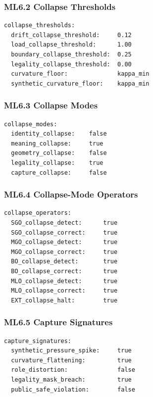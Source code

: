 \subsubsection*{ML6.2 Collapse Thresholds}

\begin{verbatim}
collapse_thresholds:
  drift_collapse_threshold:     0.12
  load_collapse_threshold:      1.00
  boundary_collapse_threshold:  0.25
  legality_collapse_threshold:  0.00
  curvature_floor:              kappa_min
  synthetic_curvature_floor:    kappa_min
\end{verbatim}
\subsubsection*{ML6.3 Collapse Modes}

\begin{verbatim}
collapse_modes:
  identity_collapse:    false
  meaning_collapse:     true
  geometry_collapse:    false
  legality_collapse:    true
  capture_collapse:     false
\end{verbatim}

\subsubsection*{ML6.4 Collapse-Mode Operators}

\begin{verbatim}
collapse_operators:
  SGO_collapse_detect:      true
  SGO_collapse_correct:     true
  MGO_collapse_detect:      true
  MGO_collapse_correct:     true
  BO_collapse_detect:       true
  BO_collapse_correct:      true
  MLO_collapse_detect:      true
  MLO_collapse_correct:     true
  EXT_collapse_halt:        true
\end{verbatim}

\subsubsection*{ML6.5 Capture Signatures}

\begin{verbatim}
capture_signatures:
  synthetic_pressure_spike:     true
  curvature_flattening:         true
  role_distortion:              false
  legality_mask_breach:         true
  public_safe_violation:        false
\end{verbatim}
